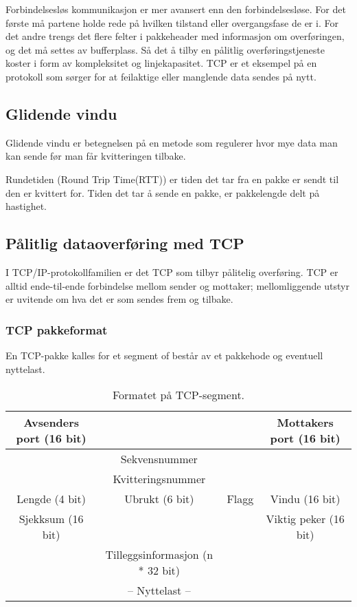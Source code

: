 \documentclass[11pt,a4paper]{article}
\begin{document}
Forbindelsesløs kommunikasjon er mer avansert enn den forbindelsesløse. For det første må partene holde rede på hvilken tilstand eller overgangsfase de er i. For det andre trengs det flere felter i pakkeheader med informasjon om overføringen, og det må settes av bufferplass. Så det å tilby en pålitlig overføringstjeneste koster i form av kompleksitet og linjekapasitet. TCP er et eksempel på en protokoll som sørger for at feilaktige eller manglende data sendes på nytt. 

\subsection{Glidende vindu}
Glidende vindu er betegnelsen på en metode som regulerer hvor mye data man kan sende før man får kvitteringen tilbake.

Rundetiden (Round Trip Time(RTT)) er tiden det tar fra en pakke er sendt til den er kvittert for. Tiden det tar å sende en pakke, er pakkelengde delt på hastighet.

\subsection{Pålitlig dataoverføring med TCP}
I TCP/IP-protokollfamilien er det TCP som tilbyr pålitelig overføring. TCP er alltid ende-til-ende forbindelse mellom sender og mottaker; mellomliggende utstyr er uvitende om hva det er som sendes frem og tilbake.

\subsubsection{TCP pakkeformat}
En TCP-pakke kalles for et segment of består av et pakkehode og eventuell nyttelast.

\begin{table}[h!]
	\begin{center}
		\begin{tabular}{| c  c c c |}
		\hline
		Avsenders port (16 bit) & & & Mottakers port (16 bit)\\
		\hline
		& Sekvensnummer & &\\
		\hline
		& Kvitteringsnummer & &\\
		\hline
		Lengde (4 bit) & Ubrukt (6 bit) & Flagg & Vindu (16 bit)\\
		\hline
		Sjekksum (16 bit) & & & Viktig peker (16 bit)\\
		\hline
		& Tilleggsinformasjon (n * 32 bit)& &\\
		\hline
		& -- Nyttelast -- & & \\
		\hline
		\end{tabular}
	\end{center}
	\caption{Formatet på TCP-segment.}
\end{table}
\end{document}

